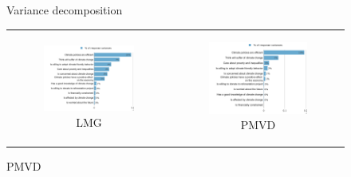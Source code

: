\documentclass{article}
\begin{document}
\begin{figure}[h!]
\begin{center}
	\caption{Variance decomposition}
	\caption*{Index Carbon Tax with Cash transfers}
	\setlength\extrarowheight{-1pt}
	\begin{tabular}{cc}
		\begin{subfigure}{0.5\textwidth}
		\caption{LMG}
			\includegraphics[width=\textwidth]{lmg_tax_transfers_non_standardized}
		\end{subfigure}&
		\begin{subfigure}{0.5\textwidth}
		\caption{PMVD}
			\includegraphics[width=\textwidth]{pmvd_tax_transfers_non_standardized}
		\end{subfigure}\\
	\end{tabular}


\end{center}
\end{figure}
\end{document}
